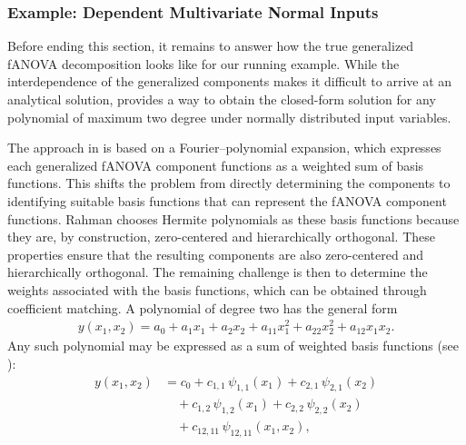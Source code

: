 \subsubsection{Example: Dependent Multivariate Normal Inputs}
Before ending this section, it remains to answer how the true generalized fANOVA decomposition looks like for our running example. While the interdependence of the generalized components makes it difficult to arrive at an analytical solution, \citet{rahman2014} provides a way to obtain the closed-form solution for any polynomial of maximum two degree under normally distributed input variables.\par
The approach in \cite{rahman2014} is based on a Fourier–polynomial expansion, 
which expresses each generalized fANOVA component functions as a weighted sum of basis functions. 
This shifts the problem from directly determining the components 
to identifying suitable basis functions that can represent the fANOVA component functions. 
Rahman chooses Hermite polynomials as these basis functions because they are, 
by construction, zero-centered and hierarchically orthogonal. 
These properties ensure that the resulting components are also 
zero-centered and hierarchically orthogonal. 
The remaining challenge is then to determine the weights associated with the basis functions, 
which can be obtained through coefficient matching.
A polynomial of degree two has the general form
\begin{align}\label{eq:quadratic_polynomial}
    y(x_1,x_2)
    = a_0 + a_1 x_1 + a_2 x_2 
      + a_{11} x_1^2 + a_{22} x_2^2 + a_{12} x_1 x_2.
\end{align}
Any such polynomial may be expressed as a sum of weighted basis functions 
(see \cite{nagler2024linalg}):
\[
\begin{aligned}
y(x_1,x_2)
    &= c_0 
     + c_{1,1}\,\psi_{1,1}(x_1) 
     + c_{2,1}\,\psi_{2,1}(x_2) \\ 
    &\quad
     + c_{1,2}\,\psi_{1,2}(x_1)
     + c_{2,2}\,\psi_{2,2}(x_2) \\
    &\quad
     + c_{12,11}\,\psi_{12,11}(x_1,x_2),
\end{aligned}
\]

